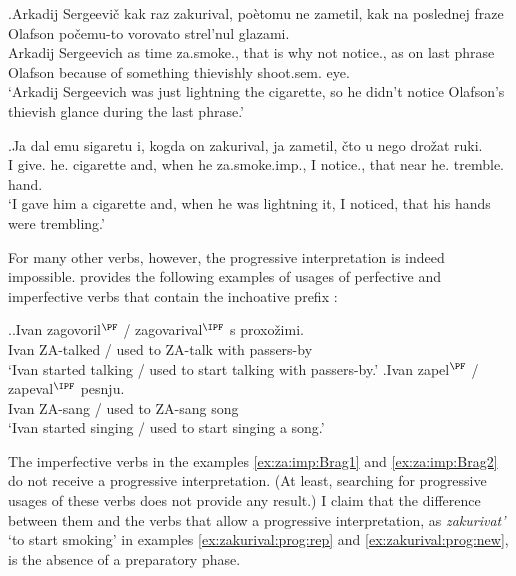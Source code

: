 \exg.\label{ex:zakurival:prog:rep}Arkadij Sergeevi\v{c} kak raz zakurival, po\`{e}tomu ne zametil, kak na poslednej fraze Olafson po\v{c}emu-to vorovato strel'nul glazami.\\
Arkadij Sergeevich as time za.smoke., {that is why} not notice., as on last phrase Olafson {because of something} thievishly shoot.sem. eye.\\
\trans `Arkadij Sergeevich was just lightning the cigarette, so he didn't notice Olafson's thievish glance during the last phrase.'

\exg.\label{ex:zakurival:prog:new}Ja dal emu sigaretu i, kogda on zakurival, ja zametil, \v{c}to u nego dro\v{z}at ruki.\\
I give. he. cigarette and, when he za.smoke.imp., I notice., that near he. tremble. hand.\\
\trans `I gave him a cigarette and, when he was lightning it, I noticed, that his hands were trembling.'\\

For many other verbs, however, the progressive interpretation is indeed impossible. \citet{Braginsky:08} provides the following examples of usages of perfective and imperfective verbs that contain the inchoative prefix :

\ex.\label{ex:za:imp:Brag}\ag.\label{ex:za:imp:Brag1}Ivan zagovoril$^{\PF}$ / zagovarival$^{\IPF}$ s proxo\v{z}imi.\\
Ivan ZA-talked / {used to ZA-talk} with passers-by\\
\trans `Ivan started talking / used to start talking with passers-by.'
\bg.\label{ex:za:imp:Brag2}Ivan zapel$^{\PF}$ / zapeval$^{\IPF}$ pesnju.\\
Ivan ZA-sang / {used to ZA-sang} song\\
\trans `Ivan started singing / used to start singing a song.'\\

The imperfective verbs in the examples \ref{ex:za:imp:Brag1} and \ref{ex:za:imp:Brag2} do not receive a progressive interpretation. (At least, searching for progressive usages of these verbs does not provide any result.) I claim that the difference between them and the verbs that allow a progressive interpretation, as \textit{zakurivat'} `to start smoking' in examples \ref{ex:zakurival:prog:rep} and \ref{ex:zakurival:prog:new}, is the absence of a preparatory phase. 

